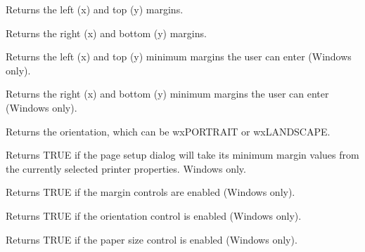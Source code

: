 
Returns the left (x) and top (y) margins.



Returns the right (x) and bottom (y) margins.



Returns the left (x) and top (y) minimum margins the user can enter (Windows only).



Returns the right (x) and bottom (y) minimum margins the user can enter (Windows only).



Returns the orientation, which can be wxPORTRAIT or wxLANDSCAPE.



Returns TRUE if the page setup dialog will take its minimum margin values from the currently
selected printer properties. Windows only.



Returns TRUE if the margin controls are enabled (Windows only).



Returns TRUE if the orientation control is enabled (Windows only).



Returns TRUE if the paper size control is enabled (Windows only).



